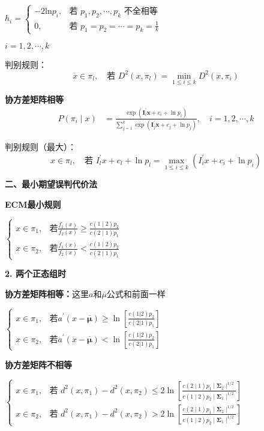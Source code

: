 \documentclass[10pt,a4paper]{ctexart} %
\begin{document}
\begin{multicols*}{3}
		$h_i=
		\begin{cases}
			-2\mathrm{ln}p_i,&\text{若 }p_1,p_2,\cdots,p_k\text{ 不全相等}\\
			0,&\text{若 }p_1=p_2=\cdots=p_k=\frac{1}{k}
		\end{cases}$
		
		$i=1,2,\cdots,k$
		
		判别规则：
		$$x\in\pi_{l},\quad\text{若 }D^2(x,\pi_l)=\min_{1\leqslant i\leqslant k}D^2(x,\pi_i)$$
		
		\textbf{协方差矩阵相等}
		$$\begin{aligned}P(\pi_{i}\mid x)&=\frac{\exp(\boldsymbol{I}_i^{\prime}\boldsymbol{x}+c_i+\ln p_i)}{\sum_{j=1}^k\exp(\boldsymbol{I}_j^{\prime}\boldsymbol{x}+c_j+\ln p_j)},\quad i=1,2,\cdots,k\end{aligned}$$
		
		判别规则（最大）：
		$$x\in\pi_{l},\quad\text{若 }I_{l}^{\prime}x+c_{l}+\ln p_{l}=\max_{1\leqslant i\leqslant k}\left(I_{i}^{\prime}x+c_{i}+\ln p_{i}\right)$$
		
		\textbf{二、最小期望误判代价法}
		
		\textbf{ECM最小规则}
		
		$\begin{cases}x{\in}\pi_{1},&\text{若}\frac{f_{1}\left(x\right)}{f_{2}\left(x\right)}{\geqslant}\frac{c\left(1\mid2\right)p_{2}}{c\left(2\mid1\right)p_{1}}\\x{\in}\pi_{2},&\text{若}\frac{f_{1}\left(x\right)}{f_{2}\left(x\right)}{<}\frac{c\left(1\mid2\right)p_{2}}{c\left(2\mid1\right)p_{1}}\end{cases}$
		
		\textbf{2. 两个正态组时}
		
		\textbf{协方差矩阵相等：}这里$a$和$\bar{\mu}$公式和前面一样
		
		$\begin{cases}x{\in}\pi_1,&\text{若}a^{\prime}(x{-}\overline{\boldsymbol{\mu}}){\geqslant}\ln\left[\frac{c(1|2)p_2}{c(2|1)p_1}\right]\\x{\in}\pi_2,&\text{若}a^{\prime}(x{-}\overline{\boldsymbol{\mu}}){<}\ln\left[\frac{c(1|2)p_2}{c(2|1)p_1}\right]\end{cases}$
		
		\textbf{协方差矩阵不相等}
		
		$\begin{cases}x\in\pi_1,&\text{若 }d^2(x,\pi_1)-d^2(x,\pi_2)\leqslant2\ln\left[\frac{c(2\mid1)p_1\mid\boldsymbol{\Sigma}_2\mid^{1/2}}{c(1\mid2)p_2\mid\boldsymbol{\Sigma}_1\mid^{1/2}}\right]\\x\in\pi_2,&\text{若 }d^2(x,\pi_1)-d^2(x,\pi_2)>2\ln\left[\frac{c(2\mid1)p_1\mid\boldsymbol{\Sigma}_2\mid^{1/2}}{c(1\mid2)p_2\mid\boldsymbol{\Sigma}_1\mid^{1/2}}\right]\end{cases}$
		

\end{multicols*}
\end{document}
